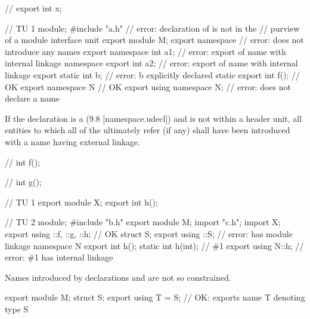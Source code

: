 \begin{std.txt}
  \pnum
  \begin{example}
    \begin{codeblock}
      // 
      export int x;

      // TU 1
      module;
      #include "a.h"            // error: declaration of  is not in the
                                // purview of a module interface unit
      export module M;
      export namespace {}       // error: does not introduce any names
      export namespace {
        int a1;                 // error: export of name with internal linkage
      }
      namespace {
        export int a2;          // error: export of name with internal linkage
      }
      export static int b;      // error: b explicitly declared static
      export int f();           // OK
      export namespace N { }    // OK
      export using namespace N; // error: does not declare a name
    \end{codeblock}
  \end{example}

  \pnum
  If the declaration is a 
  (9.8 [namespace.udecl]) and is not within a header unit,
  all entities to which all of the
   ultimately refer (if any)
  shall have been introduced with a name having external linkage.
\begin{example}
\begin{codeblock}
// 
int f();

// 
int g();

// TU 1
export module X;
export int h();

// TU 2
module;
#include "b.h"
export module M;
import "c.h";
import X;
export using ::f, ::g, ::h;     // OK
struct S;
export using ::S;               // error:  has module linkage
namespace N {
  export int h();
  static int h(int);            // \#1
}
export using N::h;              // error: \#1 has internal linkage
\end{codeblock}
\end{example}
  \enternote
  Names introduced by  declarations
  and 
  are not so constrained.
  \begin{example}
    \begin{codeblock}
      export module M;
      struct S;
      export using T = S;   // OK: exports name T denoting type S
    \end{codeblock}
  \end{example}
  \exitnote


\end{std.txt}
